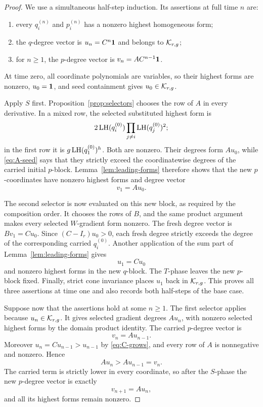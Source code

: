 \documentclass[11pt]{article}
\theoremstyle{remark}
\numberwithin{equation}{section}
\begin{document}
\begin{proof}
We use a simultaneous half-step induction.  Its assertions at full time
\(n\) are:
\begin{enumerate}[label=\textup{(\alph*)}]
\item every \(q_i^{(n)}\) and \(p_i^{(n)}\) has a nonzero highest
homogeneous form;
\item the \(q\)-degree vector is \(u_n=C^n\mathbf{1}\) and belongs to
\(\mathcal{K}_{r,g}\);
\item for \(n\geq1\), the \(p\)-degree vector is
\(v_n=AC^{n-1}\mathbf{1}\).
\end{enumerate}
At time zero, all coordinate polynomials are variables, so their highest
forms are nonzero, \(u_0=\mathbf{1}\), and seed containment gives
\(u_0\in\mathcal{K}_{r,g}\).

Apply \(S\) first.  Proposition~\ref{prop:selectors} chooses the row of
\(A\) in every derivative.  In a mixed row, the selected substituted
highest form is
\[
2\operatorname{LH}(q_i^{(0)})\prod_{j\neq i}\operatorname{LH}(q_j^{(0)})^2;
\]
in the first row it is \(g\operatorname{LH}(q_1^{(0)})^h\).
Both are nonzero.  Their degrees form \(Au_0\), while
\eqref{eq:A-seed} says that they strictly exceed the coordinatewise degrees
of the carried initial \(p\)-block.  Lemma~\ref{lem:leading-forms} therefore
shows that the new \(p\)-coordinates have nonzero highest forms and degree
vector
\[
v_1=Au_0.
\]

The second selector is now evaluated on this new block, as required by the
composition order.  It chooses the rows of \(B\), and the same product
argument makes every selected \(W\)-gradient form nonzero.  The fresh
degree vector is \(Bv_1=Cu_0\).  Since
\((C-I_r)u_0>0\), each fresh degree strictly exceeds the degree of the
corresponding carried \(q_i^{(0)}\).  Another application of the sum part
of Lemma~\ref{lem:leading-forms} gives
\[
u_1=Cu_0
\]
and nonzero highest forms in the new \(q\)-block.  The \(T\)-phase leaves
the new \(p\)-block fixed.  Finally, strict cone invariance places \(u_1\)
back in \(\mathcal{K}_{r,g}\).  This proves all three assertions at time one and
also records both half-steps of the base case.

Suppose now that the assertions hold at some \(n\geq1\).  The first
selector applies because \(u_n\in\mathcal{K}_{r,g}\).  It gives selected
gradient degrees \(Au_n\), with nonzero selected highest forms by the
domain product identity.  The carried \(p\)-degree vector is
\[
v_n=Au_{n-1}.
\]
Moreover \(u_n=Cu_{n-1}>u_{n-1}\) by \eqref{eq:C-grows}, and every row
of \(A\) is nonnegative and nonzero.  Hence
\[
Au_n>Au_{n-1}=v_n.
\]
The carried term is strictly lower in every coordinate, so after the
\(S\)-phase the new \(p\)-degree vector is exactly
\[
v_{n+1}=Au_n,
\]
and all its highest forms remain nonzero.


\end{proof}
\end{document}
